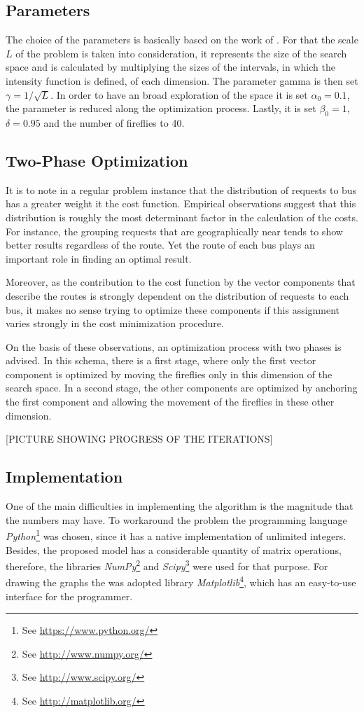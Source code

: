 \documentclass[tuberlin,cic,tc,openright,english,noabntcite,oneside]{iiufrgs}
\begin{document}
\subsection{Parameters}
The choice of the parameters is basically based on the work of \textcite[p. 37-38]{yang_firefly_2013}. For that the scale $L$ of the problem is taken into consideration, it represents the size of the search space and is calculated by multiplying the sizes of the intervals, in which the intensity function is defined, of each dimension. The parameter gamma is then set $\gamma = 1/\sqrt{L}$. In order to have an broad exploration of the space it is set $\alpha_0 = 0.1$, the parameter is reduced along the optimization process. Lastly, it is set $\beta_0 = 1$, $\delta = 0.95$ and the number of fireflies to 40.

\subsection{Two-Phase Optimization}
It is to note in a regular problem instance that the distribution of requests to bus has a greater weight it the cost function. Empirical observations suggest that this distribution is roughly the most determinant factor in the calculation of the costs. For instance, the grouping requests that are geographically near tends to show better results regardless of the route. Yet the route of each bus plays an important role in finding an optimal result.

Moreover, as the contribution to the cost function by the vector components that describe the routes is strongly dependent on the distribution of requests to each bus, it makes no sense trying to optimize these components if this assignment varies strongly in the cost minimization procedure.

On the basis of these observations, an optimization process with two phases is advised. In this schema, there is a first stage, where only the first vector component is optimized by moving the fireflies only in this dimension of the search space. In a second stage, the other components are optimized by anchoring the first component and allowing the movement of the fireflies in these other dimension.

[PICTURE SHOWING PROGRESS OF THE ITERATIONS]

\subsection{Implementation}
One of the main difficulties in implementing the algorithm is the magnitude that the numbers may have. To workaround the problem the programming language \emph{Python}\footnote{See \url{https://www.python.org/}} was chosen, since it has a native implementation of unlimited integers. Besides, the proposed model has a considerable quantity of matrix operations, therefore, the libraries \emph{NumPy}\footnote{See \url{http://www.numpy.org/}} and \emph{Scipy}\footnote{See \url{http://www.scipy.org/}} were used for that purpose. For drawing the graphs the was adopted library \emph{Matplotlib}\footnote{See \url{http://matplotlib.org/}}, which has an easy-to-use interface for the programmer.
\end{document}

